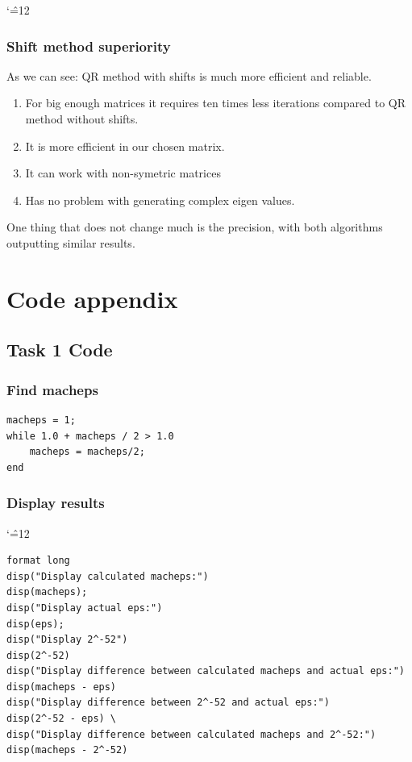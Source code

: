 \documentclass[12pt]{report}
\newenvironment{simplechar}{%
   \catcode`\^=12
}{}
\begin{document}
\begin{simplechar}
\subsection{Shift method superiority}
As we can see:
QR method with shifts is much more efficient and reliable.
\begin{enumerate}
\item For big enough matrices it requires ten times less iterations compared to QR method without shifts.
\item It is more efficient in our chosen matrix.
\item It can work with non-symetric matrices
\item Has no problem with generating complex eigen values.
\end{enumerate}
 One thing that does not change much is the precision, with both algorithms outputting similar results.






\chapter{Code appendix}

\section{Task 1 Code}
\hypertarget{function1_macheps}{\subsection{Find macheps}}
\begin{lstlisting}
macheps = 1;
while 1.0 + macheps / 2 > 1.0
    macheps = macheps/2;
end
\end{lstlisting}
\newpage
\hypertarget{function1_display}{\subsection{Display results}}
\begin{simplechar}
\begin{lstlisting}
format long
disp("Display calculated macheps:")
disp(macheps);
disp("Display actual eps:")
disp(eps);
disp("Display 2^-52")
disp(2^-52)
disp("Display difference between calculated macheps and actual eps:")
disp(macheps - eps)
disp("Display difference between 2^-52 and actual eps:")
disp(2^-52 - eps) \
disp("Display difference between calculated macheps and 2^-52:")
disp(macheps - 2^-52)
\end{lstlisting}
\end{simplechar}


\end{simplechar}
\end{document}
